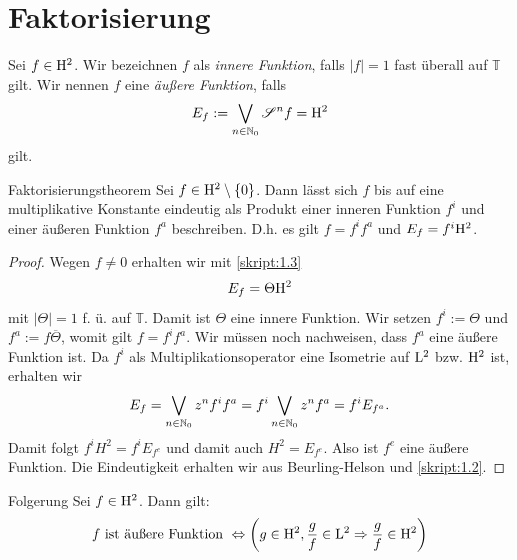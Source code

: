 \section{Faktorisierung}

\begin{df}\label{skript:2.1}
	Sei $ f \in \mathrm{H}^2 $.
	Wir bezeichnen $ f $ als \textit{innere Funktion}, falls $ | f | = 1 $ fast überall auf $ \mathbb{T} $ gilt.
	Wir nennen $ f $ eine \textit{äußere Funktion}, falls
	\begin{align*}
	E_f := \bigvee_{n \in \mathbb{N}_0} \mathscr{S}^n f = \mathrm{H}^2
	\end{align*}
	gilt.
\end{df}

\begin{genericthm}{Faktorisierungstheorem}\label{skript:2.2}
	Sei $ f \in \mathrm{H}^2 \setminus \lbrace 0 \rbrace $.
	Dann lässt sich $ f $ bis auf eine multiplikative Konstante eindeutig als Produkt einer inneren Funktion $ f^i $ und einer äußeren Funktion $ f^a $ beschreiben.
	D.h. es gilt $ f = f^i f^a $ und $ E_f = f^i \mathrm{H}^2 $.
\end{genericthm}

\begin{proof}
	Wegen $ f \neq 0 $ erhalten wir  mit \ref{skript:1.3}
	\begin{align*}
	E_f = \Theta \mathrm{H}^2	
	\end{align*}
	mit $ |\Theta| = 1  $ f. ü. auf $ \mathbb{T} $.
	Damit ist $ \Theta  $ eine innere Funktion. Wir setzen $ f^i := \Theta $ und $ f^a := f \overline{\Theta} $, womit gilt $ f = f^i f^a $. 
	Wir müssen noch nachweisen, dass $ f^a $ eine äußere Funktion ist.
	Da $ f^i $ als Multiplikationsoperator eine Isometrie auf $ \mathrm{L}^2 $ bzw. $ \mathrm{H}^2 $ ist, erhalten wir 
	\begin{align*}
	E_f
	= \bigvee_{n \in \mathbb{N}_0} z^n f^i f^a 
	= f^i \bigvee_{n \in \mathbb{N}_0} z^n f^a 
	= f^i E_{f^a}.
	\end{align*}
	Damit folgt $ f^i H^2 = f^i E_{f^e} $ und damit auch $ H^2 = E_{f^e} $. Also ist $ f^e $ eine äußere Funktion.
	Die Eindeutigkeit erhalten wir aus Beurling-Helson und \ref{skript:1.2}.
\end{proof}

\begin{genericthm}{Folgerung}\label{skript:2.3}
	Sei $ f \in \mathrm{H}^2$.
	Dann gilt:
	\begin{align*}
	f \ \text{ist äußere Funktion} \
	\Leftrightarrow
	\left(g \in \mathrm{H}^2, \frac{g}{f} \in \mathrm{L}^2 \Rightarrow \frac{g}{f} \in \mathrm{H}^2 \right)
	\end{align*}
\end{genericthm}


